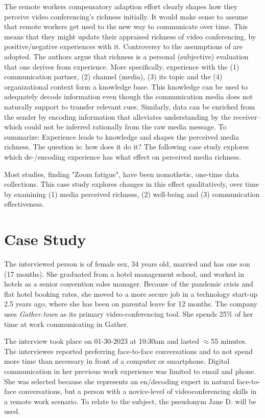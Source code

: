 \documentclass[man]{apa7}
\begin{document}
The remote workers compensatory adaption effort clearly shapes how they perceive video conferencing's richness initially. It would make sense to assume that remote workers get used to the new way to communicate over time. This means that they might update their appraised richness of video conferencing, by positive/negative experiences with it. Controversy to \citeauthor{daft1983information} the assumptions of \cite{Carlson1999} are adopted. The authors argue that richness is a personal (subjective) evaluation that one derives from experience. More specifically, experience with the (1) communication partner, (2) channel (media), (3) its topic and the (4) organizational context form a knowledge base. This knowledge can be used to adequately decode information even though the communication media does not naturally support to transfer relevant cues. Similarly, data can be enriched from the sender by encoding information that alleviates understanding by the receiver–which could not be inferred rationally from the raw media message. To summarize: Experience leads to knowledge and shapes the perceived media richness. The question is: how does it do it? The following case study explores which de-/encoding experience has what effect on perceived media richness.

Most studies, finding "Zoom fatigue", have been nomothetic, one-time data collections. This case study explores changes in this effect qualitatively, over time by examining (1) media perceived richness, (2) well-being and (3) communication effectiveness.

\section{Case Study}

The interviewed person is of female sex, 34 years old, married and has one son (17 months). She graduated from a hotel management school, and worked in hotels as a senior convention sales manager. Because of the pandemic crisis and flat hotel booking rates, she moved to a more secure job in a technology start-up 2.5 years ago, where she has been on parental leave for 12 months. The company uses \textit{Gather.town} as its primary video-conferencing tool. She spends 25\% of her time at work communicating in Gather.

The interview took place on 01-30-2023 at 10:30am and lasted $\approx$55 minutes. The interviewee reported preferring face-to-face conversations and to not spend more time than necessary in front of a computer or smartphone. Digital communication in her previous work experience was limited to email and phone. She was selected because she represents an en/decoding expert in natural face-to-face conversations, but a person with a novice-level of videoconferencing skills in a remote work scenario. To relate to the subject, the pseudonym Jane D. will be used.
\end{document}
